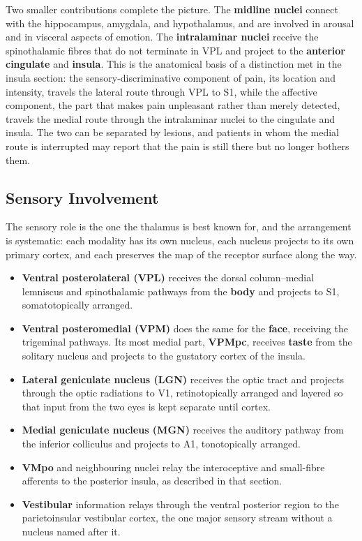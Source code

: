 \documentclass[11pt]{article}
\begin{document}
Two smaller contributions complete the picture. The \textbf{midline nuclei} connect with the hippocampus, amygdala, and hypothalamus, and are involved in arousal and in visceral aspects of emotion. The \textbf{intralaminar nuclei} receive the spinothalamic fibres that do not terminate in VPL and project to the \textbf{anterior cingulate} and \textbf{insula}. This is the anatomical basis of a distinction met in the insula section: the sensory-discriminative component of pain, its location and intensity, travels the lateral route through VPL to S1, while the affective component, the part that makes pain unpleasant rather than merely detected, travels the medial route through the intralaminar nuclei to the cingulate and insula. The two can be separated by lesions, and patients in whom the medial route is interrupted may report that the pain is still there but no longer bothers them.

\subsection{Sensory Involvement}

The sensory role is the one the thalamus is best known for, and the arrangement is systematic: each modality has its own nucleus, each nucleus projects to its own primary cortex, and each preserves the map of the receptor surface along the way.

\begin{itemize}
    \item \textbf{Ventral posterolateral (VPL)} receives the dorsal column--medial lemniscus and spinothalamic pathways from the \textbf{body} and projects to S1, somatotopically arranged.
    \item \textbf{Ventral posteromedial (VPM)} does the same for the \textbf{face}, receiving the trigeminal pathways. Its most medial part, \textbf{VPMpc}, receives \textbf{taste} from the solitary nucleus and projects to the gustatory cortex of the insula.
    \item \textbf{Lateral geniculate nucleus (LGN)} receives the optic tract and projects through the optic radiations to V1, retinotopically arranged and layered so that input from the two eyes is kept separate until cortex.
    \item \textbf{Medial geniculate nucleus (MGN)} receives the auditory pathway from the inferior colliculus and projects to A1, tonotopically arranged.
    \item \textbf{VMpo} and neighbouring nuclei relay the interoceptive and small-fibre afferents to the posterior insula, as described in that section.
    \item \textbf{Vestibular} information relays through the ventral posterior region to the parietoinsular vestibular cortex, the one major sensory stream without a nucleus named after it.
\end{itemize}
\end{document}
